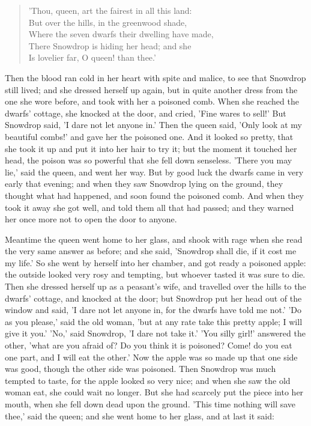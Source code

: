 \documentclass[12pt]{book}
\begin{document}
\begin{verse}
 'Thou, queen, art the fairest in all this land:\\
  But over the hills, in the greenwood shade,\\
  Where the seven dwarfs their dwelling have made,\\
  There Snowdrop is hiding her head; and she\\
  Is lovelier far, O queen! than thee.'
\end{verse}

Then the blood ran cold in her heart with spite and malice, to see
that Snowdrop still lived; and she dressed herself up again, but in
quite another dress from the one she wore before, and took with her a
poisoned comb. When she reached the dwarfs' cottage, she knocked at
the door, and cried, 'Fine wares to sell!' But Snowdrop said, 'I dare
not let anyone in.' Then the queen said, 'Only look at my beautiful
combs!' and gave her the poisoned one. And it looked so pretty, that
she took it up and put it into her hair to try it; but the moment it
touched her head, the poison was so powerful that she fell down
senseless. 'There you may lie,' said the queen, and went her way. But
by good luck the dwarfs came in very early that evening; and when they
saw Snowdrop lying on the ground, they thought what had happened, and
soon found the poisoned comb. And when they took it away she got well,
and told them all that had passed; and they warned her once more not
to open the door to anyone.

Meantime the queen went home to her glass, and shook with rage when
she read the very same answer as before; and she said, 'Snowdrop shall
die, if it cost me my life.' So she went by herself into her chamber,
and got ready a poisoned apple: the outside looked very rosy and
tempting, but whoever tasted it was sure to die. Then she dressed
herself up as a peasant's wife, and travelled over the hills to the
dwarfs' cottage, and knocked at the door; but Snowdrop put her head
out of the window and said, 'I dare not let anyone in, for the dwarfs
have told me not.' 'Do as you please,' said the old woman, 'but at any
rate take this pretty apple; I will give it you.' 'No,' said Snowdrop,
'I dare not take it.' 'You silly girl!' answered the other, 'what are
you afraid of? Do you think it is poisoned? Come! do you eat one part,
and I will eat the other.' Now the apple was so made up that one side
was good, though the other side was poisoned. Then Snowdrop was much
tempted to taste, for the apple looked so very nice; and when she saw
the old woman eat, she could wait no longer. But she had scarcely put
the piece into her mouth, when she fell down dead upon the ground.
'This time nothing will save thee,' said the queen; and she went home
to her glass, and at last it said:
\end{document}
